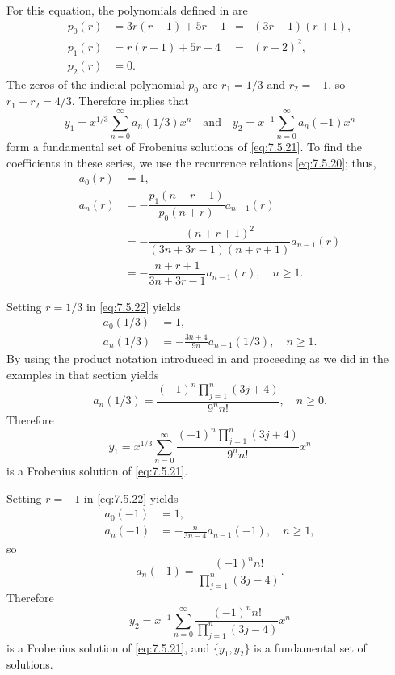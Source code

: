 \begin{solution}
For this equation, the polynomials defined in
 are
\[
\begin{aligned}
p_0(r)&=3r(r-1)+5r-1&=&(3r-1)(r+1),\\
p_1(r)&=r(r-1)+5r+4&=&(r+2)^2,\\
p_2(r)&=0.
\end{aligned}
\]
The zeros of the indicial polynomial $p_0$ are $r_1=1/3$ and $r_2=-1$,
so $r_1-r_2=4/3$. Therefore  implies that
\[
y_1=x^{1/3}\sum_{n=0}^\infty a_n(1/3)x^n\quad\text{and}\quad
y_2=x^{-1}\sum_{n=0}^\infty a_n(-1)x^n
\]
form a fundamental set of Frobenius solutions of \eqref{eq:7.5.21}. To
find the coefficients in these series, we use the recurrence relations
\eqref{eq:7.5.20};   thus,
\begin{equation} \label{eq:7.5.22}
\begin{aligned}
a_0(r)&=1,\\
a_n(r)&=-\dfrac{p_1(n+r-1)}{p_0(n+r)}a_{n-1}(r)\\
&=-\dfrac{(n+r+1)^2}{(3n+3r-1)(n+r+1)}a_{n-1}(r)\\
&=-\dfrac{n+r+1}{3n+3r-1}a_{n-1}(r),\quad n\ge1.
\end{aligned}
\end{equation}

Setting $r=1/3$ in \eqref{eq:7.5.22} yields
\begin{align*}
a_0(1/3)&=1,\\
a_n(1/3)&=-\frac{3n+4}{9n} a_{n-1}(1/3),\quad n\ge1.
\end{align*}
By using the product notation introduced in  and
proceeding as we did in the examples in that section yields
\[
a_n(1/3)=\frac{(-1)^n\prod_{j=1}^n(3j+4)}{9^nn!},\quad n\ge0.
\]
Therefore
\[
y_1=x^{1/3}\sum_{n=0}^\infty\frac{(-1)^n\prod_{j=1}^n(3j+4)}{9^nn!}x^n
\]
is a Frobenius solution of \eqref{eq:7.5.21}.

Setting $r=-1$ in \eqref{eq:7.5.22} yields
\begin{align*}
a_0(-1)&=1,\\
a_n(-1)&=-\frac{n}{3n-4}a_{n-1}(-1),\quad n\ge1,
\end{align*}
so
\[
a_n(-1)=\frac{(-1)^nn!}{\prod_{j=1}^n(3j-4)}.
\]
Therefore
\[
y_2=x^{-1}\sum_{n=0}^\infty\frac{(-1)^nn!}{\prod_{j=1}^n(3j-4)}x^n
\]
is a Frobenius solution of \eqref{eq:7.5.21}, and $\{y_1,y_2\}$ is a
fundamental set of solutions.
\end{solution}

